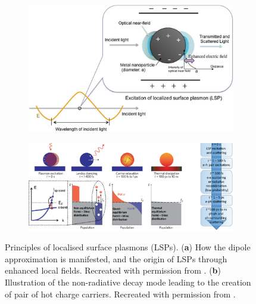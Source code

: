 \begin{figure}
\centering
\begin{subfigure}[b]{0.9\textwidth}
    \includegraphics[width=\textwidth]{figures/Theory/E_Field.jpeg}
    \caption{} 
    \label{Fig:EField}
\end{subfigure}
\begin{subfigure}[b]{0.9\textwidth}
    \includegraphics[width=\textwidth]{figures/Theory/Plasmon_Decay.png}
    \caption{}
    \label{Fig:Decay}
    \end{subfigure}
    \caption{Principles of localised surface plasmons (LSPs). (\textbf{a}) How the dipole approximation is manifested, and the origin of LSPs through enhanced local fields. Recreated with permission from \cite{Manzhos2021}. (\textbf{b}) Illustration of the non-radiative decay mode leading to the creation of  pair of hot charge carriers. Recreated with permission from \cite{AuPlasmonRev}.}
    \label{Fig:Plasmonics}
\end{figure}

